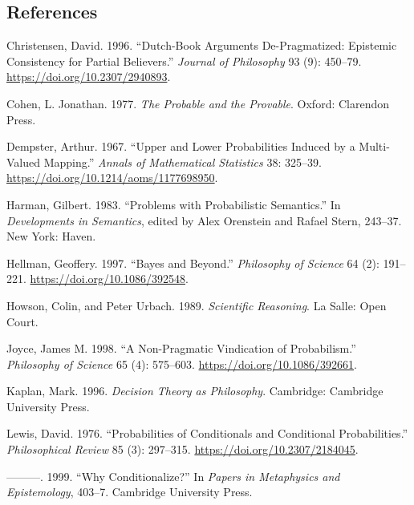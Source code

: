 \documentclass[
  11pt,
  letterpaper,
  DIV=11,
  numbers=noendperiod,
  oneside]{scrartcl}
\newlength{\cslhangindent}
\newenvironment{CSLReferences}[2] %
 {\begin{list}{}{%
  \setlength{\itemindent}{0pt}
  \setlength{\leftmargin}{0pt}
  \setlength{\parsep}{0pt}
  \ifodd #1
   \setlength{\leftmargin}{\cslhangindent}
   \setlength{\itemindent}{-1\cslhangindent}
  \fi
  \setlength{\itemsep}{#2\baselineskip}}}
 {\end{list}}
\begin{document}
\subsection*{References}\label{references}

\label{refs}
\begin{CSLReferences}{1}{0}
Christensen, David. 1996. {``Dutch-Book Arguments {D}e-Pragmatized:
Epistemic Consistency for Partial Believers.''} \emph{Journal of
Philosophy} 93 (9): 450--79. \url{https://doi.org/10.2307/2940893}.

Cohen, L. Jonathan. 1977. \emph{The Probable and the Provable}. Oxford:
Clarendon Press.

Dempster, Arthur. 1967. {``Upper and Lower Probabilities Induced by a
Multi-Valued Mapping.''} \emph{Annals of Mathematical Statistics} 38:
325--39. \url{https://doi.org/10.1214/aoms/1177698950}.

Harman, Gilbert. 1983. {``Problems with Probabilistic Semantics.''} In
\emph{Developments in Semantics}, edited by Alex Orenstein and Rafael
Stern, 243--37. New York: Haven.

Hellman, Geoffery. 1997. {``Bayes and Beyond.''} \emph{Philosophy of
Science} 64 (2): 191--221. \url{https://doi.org/10.1086/392548}.

Howson, Colin, and Peter Urbach. 1989. \emph{Scientific Reasoning}. La
Salle: Open Court.

Joyce, James M. 1998. {``A Non-Pragmatic Vindication of Probabilism.''}
\emph{Philosophy of Science} 65 (4): 575--603.
\url{https://doi.org/10.1086/392661}.

Kaplan, Mark. 1996. \emph{Decision Theory as Philosophy}. Cambridge:
Cambridge University Press.

Lewis, David. 1976. {``Probabilities of Conditionals and Conditional
Probabilities.''} \emph{Philosophical Review} 85 (3): 297--315.
\url{https://doi.org/10.2307/2184045}.

---------. 1999. {``Why Conditionalize?''} In \emph{Papers in
Metaphysics and Epistemology}, 403--7. Cambridge University Press.


\end{CSLReferences}
\end{document}

